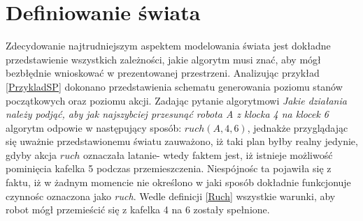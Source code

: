 \section{Definiowanie świata}
    Zdecydowanie najtrudniejszym aspektem modelowania świata jest dokładne przedstawienie wszystkich zależności, jakie algorytm musi znać,
    aby mógł bezbłędnie wnioskować w prezentowanej przestrzeni. Analizując przykład \ref{PrzykladSP} dokonano przedstawienia schematu 
    generowania poziomu stanów początkowych oraz poziomu akcji. Zadając pytanie algorytmowi \textit{Jakie działania należy podjąć, aby jak najszybciej
    przesunąć robota A z klocka 4 na klocek 6} algorytm odpowie w następujący sposób: $ruch(A,4,6)$, jednakże przyglądając się uważnie przedstawionemu światu 
    zauważono, iż taki plan byłby realny jedynie, gdyby akcja $ruch$ oznaczała latanie- wtedy faktem jest, iż istnieje możliwość pominięcia kafelka 5 podczas 
    przemieszczenia. Niespójnośc ta pojawiła się z faktu, iż w żadnym momencie nie określono w jaki sposób dokładnie funkcjonuje czynnośc oznaczona jako \textit{ruch}.
    Wedle definicji \ref{Ruch} wszystkie warunki, aby robot mógł przemieścić się z kafelka 4 na 6 zostały spełnione.

